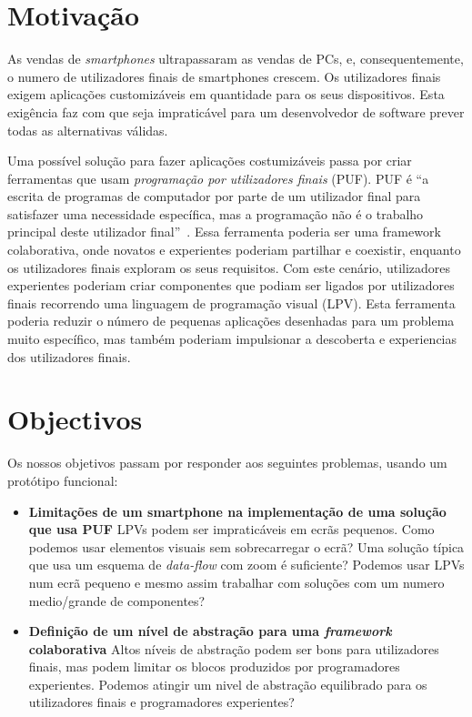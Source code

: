 \documentclass[9pt,a4paper]{extarticle}
\begin{document}
\begin{multicols}{2}

\section{Motivação}\label{sec:motiva}

As vendas de \emph{smartphones} ultrapassaram as vendas de PCs, e, consequentemente, o numero de utilizadores finais de smartphones crescem. Os utilizadores finais exigem aplicações customizáveis em quantidade para os seus dispositivos. Esta exigência faz com que seja impraticável para um desenvolvedor de software prever todas as alternativas válidas.

Uma possível solução para fazer aplicações costumizáveis passa por criar ferramentas que usam \emph{programação por utilizadores finais} (PUF).
PUF é ``a escrita de programas de computador por parte de um utilizador final para satisfazer uma necessidade específica, mas a programação não é o trabalho principal deste utilizador final''~\cite{EUSEReport}.
Essa ferramenta poderia ser uma framework colaborativa, onde novatos e experientes poderiam partilhar e coexistir, enquanto os utilizadores finais exploram os seus requisitos.
Com este cenário, utilizadores experientes poderiam criar componentes que podiam ser ligados por utilizadores finais recorrendo uma linguagem de programação visual (LPV).
Esta ferramenta poderia reduzir o número de pequenas aplicações desenhadas para um problema muito específico, mas também poderiam impulsionar a descoberta e experiencias dos utilizadores finais.

\section{Objectivos}\label{sec:goals}

Os nossos objetivos passam por responder aos seguintes problemas, usando um protótipo funcional:

\begin{itemize}
	\item{\textbf{Limitações de um smartphone na implementação de uma solução que usa PUF} 
	LPVs podem ser impraticáveis em ecrãs pequenos. Como podemos usar elementos visuais sem sobrecarregar o ecrã? Uma solução típica que usa um esquema de \emph{data-flow} com zoom é suficiente? Podemos usar LPVs num ecrã pequeno
	e mesmo assim trabalhar com soluções com um numero medio/grande de componentes?}

	\item{\textbf{Definição de um nível de abstração para uma \emph{framework} colaborativa} 
	Altos níveis de abstração podem ser bons para utilizadores finais, mas podem limitar os blocos produzidos por programadores experientes. Podemos atingir um nivel de abstração equilibrado para os utilizadores finais e programadores experientes?}
  

\end{itemize}
\end{multicols}
\end{document}
